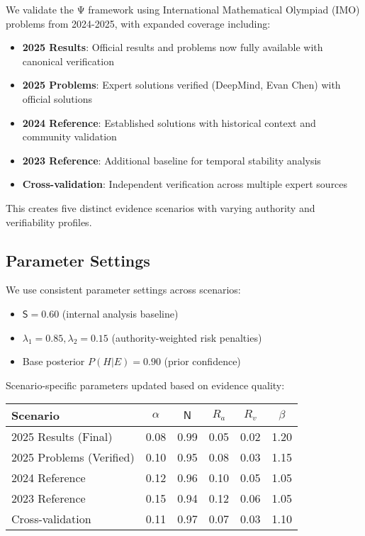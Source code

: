 \documentclass[12pt,a4paper]{article}
\newcommand{\Ssig}{\mathsf{S}}
\newcommand{\Nsig}{\mathsf{N}}
\newcommand{\alloc}{\alpha}
\newcommand{\rA}{R_a}
\newcommand{\rV}{R_v}
\newcommand{\lA}{\lambda_1}
\newcommand{\lV}{\lambda_2}
\newcommand{\uplift}{\beta}
\begin{document}
We validate the Ψ framework using International Mathematical Olympiad (IMO) problems from 2024-2025, with expanded coverage including:

\begin{itemize}
\item \textbf{2025 Results}: Official results and problems now fully available with canonical verification
\item \textbf{2025 Problems}: Expert solutions verified (DeepMind, Evan Chen) with official solutions
\item \textbf{2024 Reference}: Established solutions with historical context and community validation
\item \textbf{2023 Reference}: Additional baseline for temporal stability analysis
\item \textbf{Cross-validation}: Independent verification across multiple expert sources
\end{itemize}

This creates five distinct evidence scenarios with varying authority and verifiability profiles.

\subsection{Parameter Settings}

We use consistent parameter settings across scenarios:
\begin{itemize}
\item $\Ssig = 0.60$ (internal analysis baseline)
\item $\lA = 0.85, \lV = 0.15$ (authority-weighted risk penalties)
\item Base posterior $P(H|E) = 0.90$ (prior confidence)
\end{itemize}

Scenario-specific parameters updated based on evidence quality:

\begin{center}
\begin{tabular}{@{}lccccc@{}}
\toprule
Scenario & $\alloc$ & $\Nsig$ & $\rA$ & $\rV$ & $\uplift$ \\
\midrule
2025 Results (Final) & 0.08 & 0.99 & 0.05 & 0.02 & 1.20 \\
2025 Problems (Verified) & 0.10 & 0.95 & 0.08 & 0.03 & 1.15 \\
2024 Reference & 0.12 & 0.96 & 0.10 & 0.05 & 1.05 \\
2023 Reference & 0.15 & 0.94 & 0.12 & 0.06 & 1.05 \\
Cross-validation & 0.11 & 0.97 & 0.07 & 0.03 & 1.10 \\
\bottomrule
\end{tabular}
\end{center}
\end{document}

